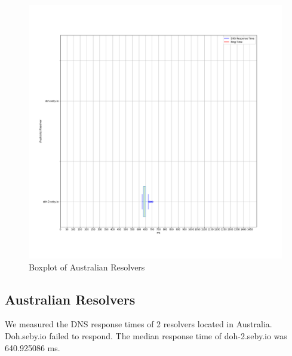 \begin{figure}[!t]
    \includegraphics[width=\linewidth]{figures/100_Australia.png}
    \caption{Boxplot of Australian Resolvers}
    \label{fig:AusPlots}
\end{figure}

\subsection{Australian Resolvers}
We measured the DNS response times of 2 resolvers located in Australia. 
Doh.seby.io failed to respond. 
The median response time of doh-2.seby.io was 640.925086 ms. 

